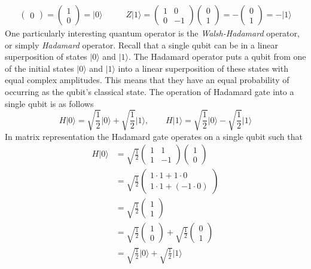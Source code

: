 \begin{align*}
\begin{pmatrix}
		0
	\end{pmatrix} = 
	\begin{pmatrix}
		1\\
		0
	\end{pmatrix}
	= 
	\vert 0 \rangle \quad & \quad Z\vert 1 \rangle =
	\begin{pmatrix}
		1	&	0\\
		0	&	-1
	\end{pmatrix}
	\begin{pmatrix}
		0\\
		1
	\end{pmatrix} = - 
	\begin{pmatrix}
		0\\
		1
	\end{pmatrix}
	= 
	 -\vert 1 \rangle
\end{align*}
One particularly interesting quantum operator is the \textit{Walsh-Hadamard} operator, or simply \textit{Hadamard} operator. Recall that a single qubit can be in a linear superposition of states $\vert 0 \rangle$ and $\vert 1 \rangle$. The Hadamard operator puts a qubit from one of the initial states $\vert 0 \rangle$ and $\vert 1 \rangle$ into a linear superposition of these states with equal complex amplitudes. This means that they have an equal probability of occurring as the qubit's classical state. The operation of Hadamard gate into a single qubit is as follows
\[
	H\vert 0 \rangle = \sqrt{\frac{1}{2}} \vert 0 \rangle + \sqrt{\frac{1}{2}}\vert 1 \rangle, \quad \quad H\vert 1 \rangle = \sqrt{\frac{1}{2}} \vert 0 \rangle - \sqrt{\frac{1}{2}}\vert 1 \rangle
\]
In matrix representation the Hadamard gate operates on a single qubit such that
\begin{align*}
	H\vert 0 \rangle &=
	\sqrt{\frac{1}{2}}
	\begin{pmatrix}
		1 & 1\\
		1 & -1
	\end{pmatrix}
	\begin{pmatrix}
		1\\
		0
	\end{pmatrix}\\
	&=
	\sqrt{\frac{1}{2}}
	\begin{pmatrix}
		1 \cdot 1 + 1 \cdot 0\\
		1 \cdot 1 + (-1 \cdot 0) 
	\end{pmatrix}\\
	&=
	\sqrt{\frac{1}{2}}
	\begin{pmatrix}
		1\\
		1
	\end{pmatrix}\\
	&=
	\sqrt{\frac{1}{2}}
	\begin{pmatrix}
		1\\
		0
	\end{pmatrix}
	+
	\sqrt{\frac{1}{2}}
	\begin{pmatrix}
		0\\
		1
	\end{pmatrix}\\
	&= 
	\sqrt{\frac{1}{2}} \vert 0 \rangle + \sqrt{\frac{1}{2}}\vert 1 \rangle
\end{align*}
